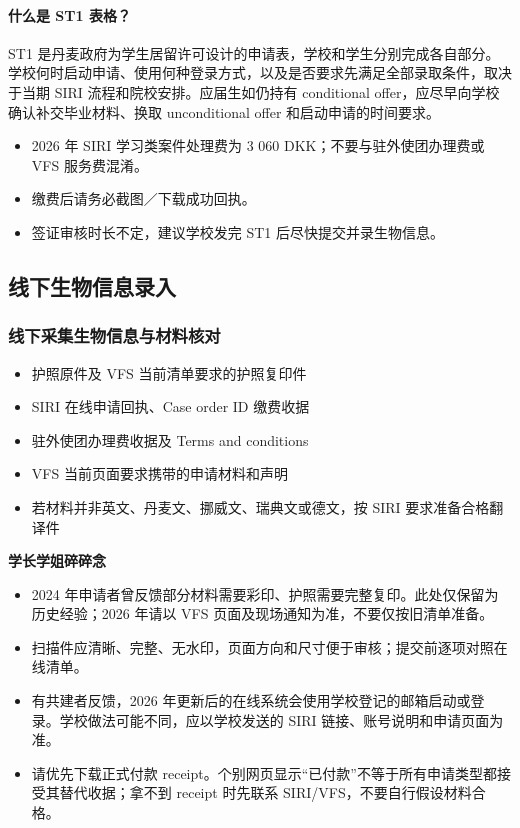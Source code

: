 \paragraph{什么是 ST1 表格？}

ST1 是丹麦政府为学生居留许可设计的申请表，学校和学生分别完成各自部分。学校何时启动申请、使用何种登录方式，以及是否要求先满足全部录取条件，取决于当期 SIRI 流程和院校安排。应届生如仍持有 conditional offer，应尽早向学校确认补交毕业材料、换取 unconditional offer 和启动申请的时间要求。

\begin{itemize}[label=•,leftmargin=2em,itemsep=2pt]
  \item 2026 年 SIRI 学习类案件处理费为 3 060 DKK；不要与驻外使团办理费或 VFS 服务费混淆。
  \item 缴费后请务必截图／下载成功回执。
  \item 签证审核时长不定，建议学校发完 ST1 后尽快提交并录生物信息。
\end{itemize}

\subsection{线下生物信息录入}

\subsubsection{线下采集生物信息与材料核对}

\begin{itemize}[label=•,leftmargin=2em,itemsep=2pt]
  \item 护照原件及 VFS 当前清单要求的护照复印件
  \item SIRI 在线申请回执、Case order ID 缴费收据
  \item 驻外使团办理费收据及 Terms and conditions
  \item VFS 当前页面要求携带的申请材料和声明
  \item 若材料并非英文、丹麦文、挪威文、瑞典文或德文，按 SIRI 要求准备合格翻译件
\end{itemize}

\begin{grayleftbox}{\textbf{学长学姐碎碎念}}
  \experiencenotice
  \begin{itemize}
    \item 2024 年申请者曾反馈部分材料需要彩印、护照需要完整复印。此处仅保留为历史经验；2026 年请以 VFS 页面及现场通知为准，不要仅按旧清单准备。
    \item 扫描件应清晰、完整、无水印，页面方向和尺寸便于审核；提交前逐项对照在线清单。
    \item 有共建者反馈，2026 年更新后的在线系统会使用学校登记的邮箱启动或登录。学校做法可能不同，应以学校发送的 SIRI 链接、账号说明和申请页面为准。
    \item 请优先下载正式付款 receipt。个别网页显示“已付款”不等于所有申请类型都接受其替代收据；拿不到 receipt 时先联系 SIRI/VFS，不要自行假设材料合格。
  \end{itemize}
\end{grayleftbox}


